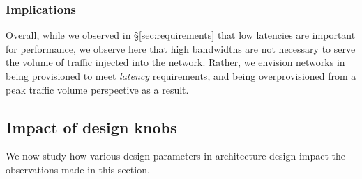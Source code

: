 \subsubsection{Implications}
\label{ssec:implications}
Overall, while we observed in \S\ref{sec:requirements} that low latencies are important for performance, we observe here that high bandwidths are not necessary to serve the volume of traffic injected into the network. Rather, we envision networks in \ddc being provisioned to meet \emph{latency} requirements, and being overprovisioned from a peak traffic volume perspective as a result.  


\subsection{Impact of design knobs}
\label{ssec:knobs}
We now study how various design parameters in \dis architecture design impact the observations made in this section. 



    

